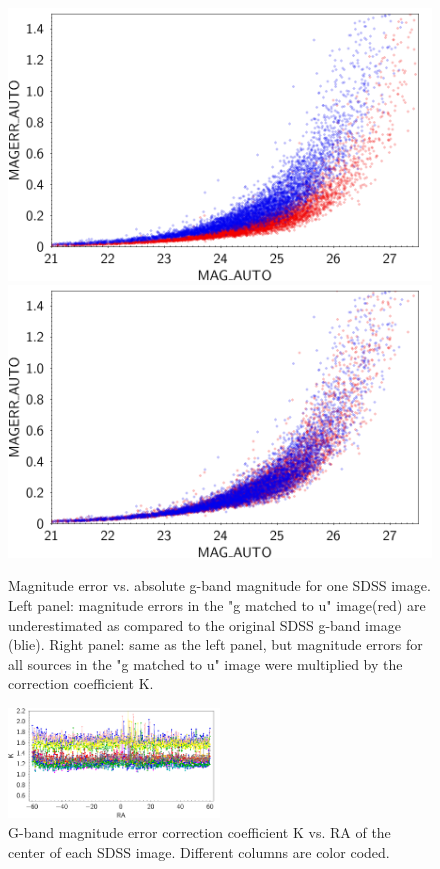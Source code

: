 \documentclass[apj,iop]{emulateapj}
\begin{document}
\begin{figure}[!ht]
\includegraphics[width=0.5\linewidth]{figures/figure_magerr_corr_gband_example_uncorr.png}
\includegraphics[width=0.5\linewidth]{figures/figure_magerr_corr_gband_example_corr.png}
\caption{Magnitude error vs. absolute g-band magnitude for one SDSS image. Left panel: magnitude errors in the "g matched to u" image(red) are underestimated as compared to the original SDSS g-band image (blie). Right panel: same as the left panel, but magnitude errors for all sources in the "g matched to u" image were multiplied by the correction coefficient K.}
\label{fig:magerr_corr_example}
\end{figure}

\begin{figure}[!h]
\includegraphics[width=0.5\textwidth]{figures/figure_all_band_correction_lines.png}
\caption{G-band magnitude error correction coefficient K vs. RA of the center of each SDSS image. Different columns are color coded.}
\label{fig:all_band_corr}
\end{figure}
\end{document}
